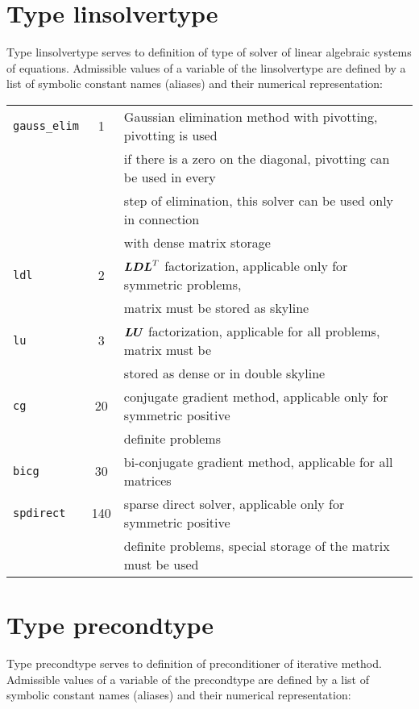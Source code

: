 \clearpage
\section{Type {\sf linsolvertype}}
\label{sectlinsolvertype}
Type {\sf linsolvertype} serves to definition of type of solver of linear algebraic systems of equations.
Admissible values of a variable of the {\sf linsolvertype} are defined by a list of symbolic constant names (aliases)
and their numerical representation:

\begin{center}
\begin{tabular}{|l|c|l|}
\hline
{\tt gauss\_elim} & 1 & Gaussian elimination method with pivotting, pivotting is used
\\
 & & if there is a zero on the diagonal, pivotting can be used in every
\\
 & & step of elimination, this solver can be used only in connection
\\
 & & with dense matrix storage
\\ \hline
{\tt ldl} & 2 & $\mbox{\boldmath$LDL$}^T$ factorization, applicable only for symmetric problems,
\\
 & & matrix must be stored as skyline
\\ \hline
{\tt lu} & 3 & $\mbox{\boldmath$LU$}$ factorization, applicable for all problems, matrix must be
\\
 & & stored as dense or in double skyline
\\ \hline
{\tt cg} & 20 & conjugate gradient method, applicable only for symmetric positive
\\
 & & definite problems
\\ \hline
{\tt bicg} & 30 & bi-conjugate gradient method, applicable for all matrices
\\ \hline
{\tt spdirect} & 140 & sparse direct solver, applicable only for symmetric positive
\\
 & & definite problems, special storage of the matrix must be used
\\ \hline
\end{tabular}
\end{center}

\section{Type {\sf precondtype}}
\label{sectprecontype}
Type {\sf precondtype} serves to definition of preconditioner of iterative method.
Admissible values of a variable of the {\sf precondtype} are defined by a list of symbolic constant names (aliases)
and their numerical representation:


